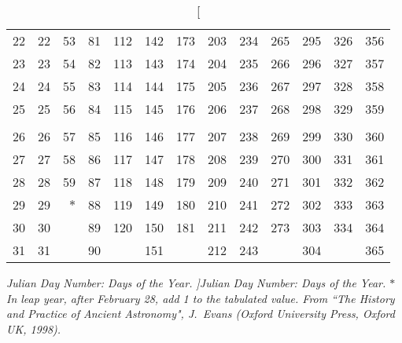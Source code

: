 \begin{table}[h]
\begin{tabular}{r|rrrrrrrrrrrr}
22& 22& 53& 81& 112& 142& 173& 203& 234& 265& 295& 326& 356\\
23& 23& 54& 82& 113& 143& 174& 204& 235& 266&296& 327& 357\\
24& 24& 55& 83& 114& 144& 175& 205& 236& 267& 297& 328& 358\\
25&25&56& 84& 115& 145& 176& 206& 237& 268& 298& 329& 359\\
&&&&&&&&&&&&\\
26& 26& 57& 85& 116& 146& 177& 207& 238& 269& 299& 330& 360\\
27& 27& 58& 86& 117& 147& 178& 208& 239& 270& 300& 331& 361\\
28& 28& 59& 87& 118&148& 179& 209& 240& 271& 301& 332& 362\\
29&29&$\ast$&88&119& 149& 180& 210& 241& 272& 302& 333& 363\\
30&30&&89&120&150& 181& 211& 242& 273& 303& 334& 364\\
31&31&&90&&151&&212&243&&304&&365\\
\end{tabular}
\caption[\em Julian Day Number: Days of the Year. ]{\em Julian Day Number: Days of the Year. $\ast$\,In leap year,
after February 28, add 1 to the tabulated value. From ``The History
and Practice of Ancient Astronomy", J.~Evans (Oxford University Press, Oxford UK, 1998).}\label{kt3}
\end{table}
